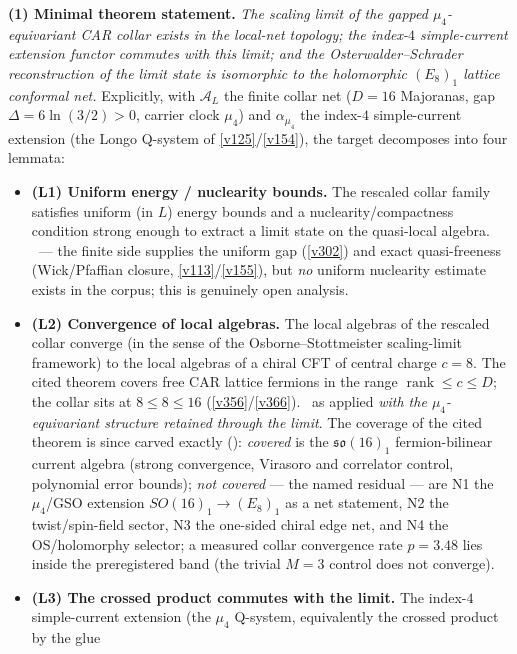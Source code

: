 \documentclass[11pt,a4paper]{article}
\begin{document}
\par\smallskip\noindent\textbf{(1) Minimal theorem statement.} \emph{The scaling limit of the
gapped $\mu_4$-equivariant CAR collar exists in the local-net topology; the index-$4$
simple-current extension functor commutes with this limit; and the Osterwalder--Schrader
reconstruction of the limit state is isomorphic to the holomorphic $(E_8)_1$ lattice conformal
net.} Explicitly, with $\mathcal A_L$ the finite collar net ($D=16$ Majoranas, gap
$\Delta=6\ln(3/2)>0$, carrier clock $\mu_4$) and $\alpha_{\mu_4}$ the index-$4$ simple-current
extension (the Longo Q-system of \vref{v125}/\vref{v154}), the target decomposes into four
lemmata:
\begin{itemize}
\item \textbf{(L1) Uniform energy / nuclearity bounds.} The rescaled collar family satisfies
  uniform (in $L$) energy bounds and a nuclearity/compactness condition strong enough to extract
  a limit state on the quasi-local algebra. \mO\ --- the finite side supplies the uniform gap
  (\vref{v302}) and exact quasi-freeness (Wick/Pfaffian closure, \vref{v113}/\vref{v155}), but
  \emph{no} uniform nuclearity estimate exists in the corpus; this is genuinely open analysis.
\item \textbf{(L2) Convergence of local algebras.} The local algebras of the rescaled collar
  converge (in the sense of the Osborne--Stottmeister scaling-limit framework) to the local
  algebras of a chiral CFT of central charge $c=8$. The cited theorem covers free CAR lattice
  fermions in the range $\operatorname{rank}\le c\le D$; the collar sits at $8\le8\le16$
  (\vref{v356}/\vref{v366}). \mO\ as applied \emph{with the $\mu_4$-equivariant structure
  retained through the limit}. The coverage of the cited theorem is since carved exactly
  (): \emph{covered} is the $\mathfrak{so}(16)_1$
  fermion-bilinear current algebra (strong convergence, Virasoro and correlator control,
  polynomial error bounds); \emph{not covered} --- the named residual --- are N1 the
  $\mu_4$/GSO extension $SO(16)_1\to(E_8)_1$ as a net statement, N2 the twist/spin-field
  sector, N3 the one-sided chiral edge net, and N4 the OS/holomorphy selector; a measured
  collar convergence rate $p=3.48$ lies inside the preregistered band (the trivial $M{=}3$
  control does not converge).
\item \textbf{(L3) The crossed product commutes with the limit.} The index-$4$ simple-current
  extension (the $\mu_4$ Q-system, equivalently the crossed product by the glue

\end{itemize}
\end{document}
